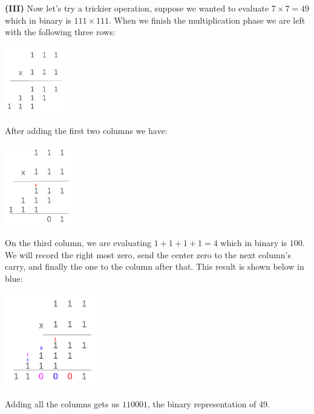 \documentclass[12pt]{article}
\begin{document}
	\hspace{0.45cm}
	\begin{minipage}[t]{.5\linewidth} 
		
		\par\noindent \textbf{(III)} Now let's try a trickier operation, suppose we wanted to evaluate \(7 \times 7 = 49\) which in binary is \(111 \times 111\). When we finish the multiplication phase we are left with the following three rows:
		
		\begin{center}
		 	\includegraphics[width=2.7cm]{bin-multi-3.png}
		\end{center}
	
		\par\noindent After adding the first two columns we have:
		
		\begin{center}
			\includegraphics[width=3.0cm]{bin-multi-4.png}
		\end{center}
	
		\par\noindent On the third column, we are evaluating \(1 + 1 + 1 + 1 = 4\) which in binary is \(100\). We will record the right most zero, send the center zero to the next column's carry, and finally the one to the column after that. This result is shown below in blue:
		
		\begin{center}
			\includegraphics[width=4.0cm]{bin-multi-5.png}
		\end{center}
	
		\par\noindent Adding all the columns gets us \(110001\), the binary representation of 49.
		
	\end{minipage}
\end{document}

